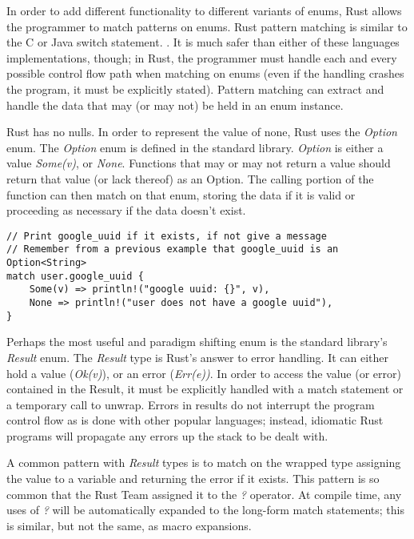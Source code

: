 \documentclass[12pt]{article}
\begin{document}
In order to add different functionality to different variants of
enums, Rust allows the programmer to match patterns on enums. Rust
pattern matching is similar to the C or Java switch statement.
\textit{\cite{the-c-programming-language}}. It is much safer than
either of these languages implementations, though; in Rust, the
programmer must handle each and every possible control flow path
when matching on enums (even if the handling crashes the program,
it must be explicitly stated). Pattern matching can extract and
handle the data that may (or may not) be held in an enum instance.

Rust has no nulls. In order to represent the value of none, Rust uses the
\textit{Option} enum. The \textit{Option} enum is defined in the standard
library. \textit{Option} is either a value \textit{Some(v)}, or \textit{None}.
Functions that may or may not return a value should return that value (or lack
thereof) as an Option. The calling portion of the function can then match on
that enum, storing the data if it is valid or proceeding as necessary if the
data doesn't exist.

\singlespacing{}
\begin{verbatim}
// Print google_uuid if it exists, if not give a message
// Remember from a previous example that google_uuid is an Option<String>
match user.google_uuid {
    Some(v) => println!("google uuid: {}", v),
    None => println!("user does not have a google uuid"),
}
\end{verbatim}
\doublespacing{}

Perhaps the most useful and paradigm shifting enum is the standard library's
\textit{Result} enum. The \textit{Result} type is Rust's answer to error
handling. It can either hold a value (\textit{Ok(v)}), or an error
(\textit{Err(e))}. In order to access the value (or error) contained in the
Result, it must be explicitly handled with a match statement or a temporary call
to unwrap. Errors in results do not interrupt the program control flow as is
done with other popular languages; instead, idiomatic Rust programs will propagate
any errors up the stack to be dealt with.

A common pattern with \textit{Result} types is to match on the wrapped type
assigning the value to a variable and returning the error if it exists. This
pattern is so common that the Rust Team assigned it to the \textit{?} operator.
At compile time, any uses of \textit{?} will be automatically expanded to the
long-form match statements; this is similar, but not the same, as macro
expansions.
\end{document}
